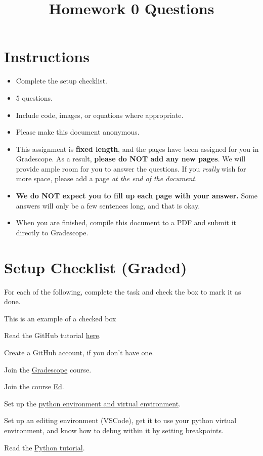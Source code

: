 \documentclass[11pt]{article}
\date{}
\title{\vspace{-1cm}Homework 0 Questions}
\newcommand{\cmark}{\ding{51}}%
\newcommand{\done}{\rlap{$\square$}{\raisebox{2pt}{\large\hspace{1pt}\cmark}}%
\hspace{-2.5pt}}
\begin{document}
\maketitle
\vspace{-2cm}
\thispagestyle{fancy}

\section*{Instructions}
\begin{itemize}
  \item Complete the setup checklist.
  \item 5 questions.
  \item Include code, images, or equations where appropriate.
  \item Please make this document anonymous.
  \item This assignment is \textbf{fixed length}, and the pages have been assigned for you in Gradescope. As a result, \textbf{please do NOT add any new pages}. We will provide ample room for you to answer the questions. If you \emph{really} wish for more space, please add a page \emph{at the end of the document}.
  \item \textbf{We do NOT expect you to fill up each page with your answer.} Some answers will only be a few sentences long, and that is okay.
  \item When you are finished, compile this document to a PDF and submit it directly to Gradescope.

\end{itemize}

\section*{Setup Checklist (Graded)}

For each of the following, complete the task and check the box to mark it as done.
\begin{todolist}
    \item[\done] This is an example of a checked box
    \item Read the GitHub tutorial \href{https://browncsci1430.github.io/webpage/resources/github_guide/}{here}.
    \item Create a GitHub account, if you don't have one.
    \item Join the \href{https://www.gradescope.com/}{Gradescope} course.
    \item Join the course \href{https://edstem.org/us/courses/19571/discussion/}{Ed}.
    \item Set up the \href{https://browncsci1430.github.io/webpage/resources/python_setup/}{python environment and virtual environment}.
    \item Set up an editing environment (VSCode), get it to use your python virtual environment, and know how to debug within it by setting breakpoints.
    \item Read the \href{https://browncsci1430.github.io/webpage/resources/python_tutorial/}{Python tutorial}.
\end{todolist}
\end{document}
